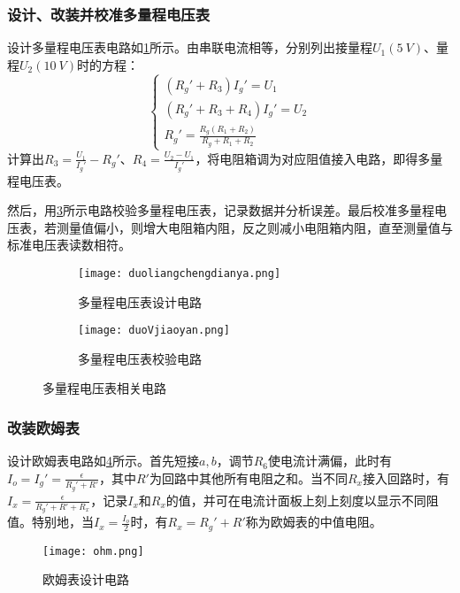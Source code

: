 \documentclass[]{../template/Report}
\begin{document}
\subsubsection{设计、改装并校准多量程电压表}
    设计多量程电压表电路如\cref{duoliangchengdianya}所示。由串联电流相等，分别列出接量程$U_1(\SI{5}{V})$、量程$U_2(\SI{10}{V})$时的方程：
    \begin{equation}
        \begin{cases}
            (R_g'+R_3)I_g' = U_1\\
            (R_g'+R_3+R_4)I_g' = U_2\\
            R_g' = \frac{R_g(R_1+R_2)}{R_g+R_1+R_2}
        \end{cases}
    \end{equation}
    计算出$R_3=\frac{U_1}{I_g'}-R_g'$、$R_4 = \frac{U_2-U_1}{I_g'}$，将电阻箱调为对应阻值接入电路，即得多量程电压表。

    然后，用\cref{duoVjiaoyan}所示电路校验多量程电压表，记录数据并分析误差。最后校准多量程电压表，若测量值偏小，则增大电阻箱内阻，反之则减小电阻箱内阻，直至测量值与标准电压表读数相符。
    \begin{figure}[htbp]
        \centering
        \begin{subfigure}[b]{0.45\textwidth}
            \texttt{[image: duoliangchengdianya.png]}
            \caption{多量程电压表设计电路}
            \label{duoliangchengdianya}
        \end{subfigure}
        \hfill
        \begin{subfigure}[b]{0.45\textwidth}
            \texttt{[image: duoVjiaoyan.png]}
            \caption{多量程电压表校验电路}
            \label{duoVjiaoyan}
        \end{subfigure}
        \caption{多量程电压表相关电路}
    \end{figure}

\subsubsection{改装欧姆表}
    设计欧姆表电路如\cref{ohm}所示。首先短接$a,b$，调节$R_6$使电流计满偏，此时有$I_o = I_g' = \frac{\epsilon}{R_g'+R'}$，其中$R'$为回路中其他所有电阻之和。当不同$R_x$接入回路时，有$I_x = \frac{\epsilon}{R_g'+R'+R_x}$，记录$I_x$和$R_x$的值，并可在电流计面板上刻上刻度以显示不同阻值。特别地，当$I_x=\frac{I_o}{2}$时，有$R_x = R_g' + R'$称为欧姆表的中值电阻。
    \begin{figure}[htbp]
        \centering
        \texttt{[image: ohm.png]}
        \caption{欧姆表设计电路}
        \label{ohm}
    \end{figure}
\end{document}
